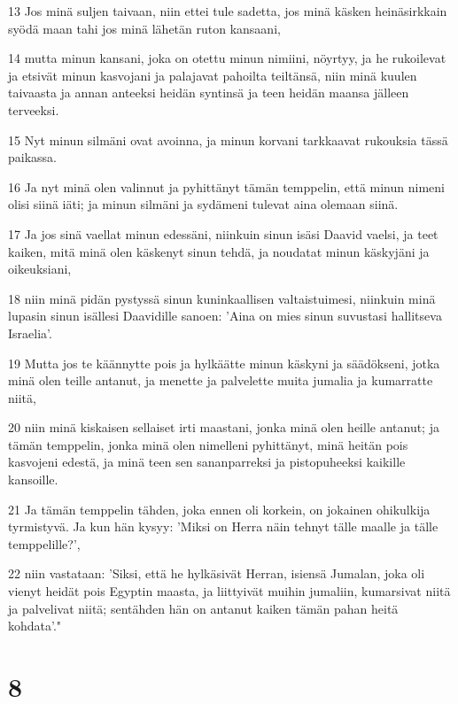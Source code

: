 \par 13 Jos minä suljen taivaan, niin ettei tule sadetta, jos minä käsken heinäsirkkain syödä maan tahi jos minä lähetän ruton kansaani,
\par 14 mutta minun kansani, joka on otettu minun nimiini, nöyrtyy, ja he rukoilevat ja etsivät minun kasvojani ja palajavat pahoilta teiltänsä, niin minä kuulen taivaasta ja annan anteeksi heidän syntinsä ja teen heidän maansa jälleen terveeksi.
\par 15 Nyt minun silmäni ovat avoinna, ja minun korvani tarkkaavat rukouksia tässä paikassa.
\par 16 Ja nyt minä olen valinnut ja pyhittänyt tämän temppelin, että minun nimeni olisi siinä iäti; ja minun silmäni ja sydämeni tulevat aina olemaan siinä.
\par 17 Ja jos sinä vaellat minun edessäni, niinkuin sinun isäsi Daavid vaelsi, ja teet kaiken, mitä minä olen käskenyt sinun tehdä, ja noudatat minun käskyjäni ja oikeuksiani,
\par 18 niin minä pidän pystyssä sinun kuninkaallisen valtaistuimesi, niinkuin minä lupasin sinun isällesi Daavidille sanoen: 'Aina on mies sinun suvustasi hallitseva Israelia'.
\par 19 Mutta jos te käännytte pois ja hylkäätte minun käskyni ja säädökseni, jotka minä olen teille antanut, ja menette ja palvelette muita jumalia ja kumarratte niitä,
\par 20 niin minä kiskaisen sellaiset irti maastani, jonka minä olen heille antanut; ja tämän temppelin, jonka minä olen nimelleni pyhittänyt, minä heitän pois kasvojeni edestä, ja minä teen sen sananparreksi ja pistopuheeksi kaikille kansoille.
\par 21 Ja tämän temppelin tähden, joka ennen oli korkein, on jokainen ohikulkija tyrmistyvä. Ja kun hän kysyy: 'Miksi on Herra näin tehnyt tälle maalle ja tälle temppelille?',
\par 22 niin vastataan: 'Siksi, että he hylkäsivät Herran, isiensä Jumalan, joka oli vienyt heidät pois Egyptin maasta, ja liittyivät muihin jumaliin, kumarsivat niitä ja palvelivat niitä; sentähden hän on antanut kaiken tämän pahan heitä kohdata'."

\chapter{8}

